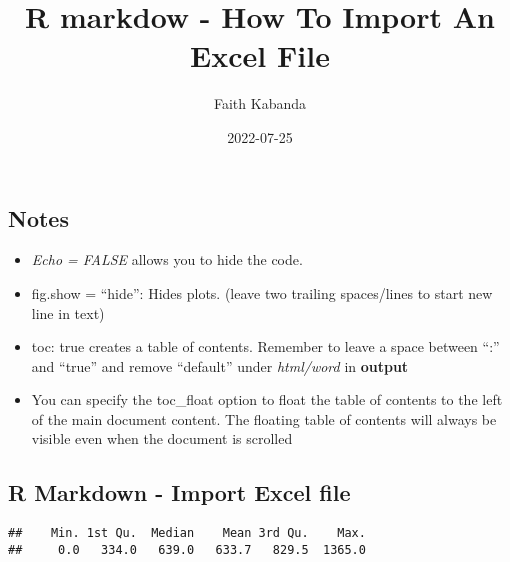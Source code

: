 \documentclass[
]{article}
\title{R markdow - How To Import An Excel File}
\author{Faith Kabanda}
\date{2022-07-25}
\newenvironment{Shaded}{\begin{snugshade}}{\end{snugshade}}
\newcommand{\AttributeTok}[1]{\textcolor[rgb]{0.77,0.63,0.00}{#1}}
\newcommand{\FunctionTok}[1]{\textcolor[rgb]{0.00,0.00,0.00}{#1}}
\newcommand{\NormalTok}[1]{#1}
\newcommand{\OtherTok}[1]{\textcolor[rgb]{0.56,0.35,0.01}{#1}}
\newcommand{\SpecialCharTok}[1]{\textcolor[rgb]{0.00,0.00,0.00}{#1}}
\newcommand{\StringTok}[1]{\textcolor[rgb]{0.31,0.60,0.02}{#1}}
\begin{document}
\maketitle

{
\setcounter{tocdepth}{2}
\tableofcontents
}
\hypertarget{notes}{%
\subsection{Notes}\label{notes}}

\begin{itemize}
\item
  \emph{Echo = FALSE} allows you to hide the code.
\item
  fig.show = ``hide'': Hides plots. (leave two trailing spaces/lines to
  start new line in text)
\item
  toc: true creates a table of contents. Remember to leave a space
  between ``:'' and ``true'' and remove ``default'' under
  \emph{html/word} in \textbf{output}
\item
  You can specify the toc\_float option to float the table of contents
  to the left of the main document content. The floating table of
  contents will always be visible even when the document is scrolled
\end{itemize}

\hypertarget{r-markdown---import-excel-file}{%
\subsection{R Markdown - Import Excel
file}\label{r-markdown---import-excel-file}}

\begin{Shaded}
\end{Shaded}

\begin{verbatim}
##    Min. 1st Qu.  Median    Mean 3rd Qu.    Max. 
##     0.0   334.0   639.0   633.7   829.5  1365.0
\end{verbatim}
\end{document}
